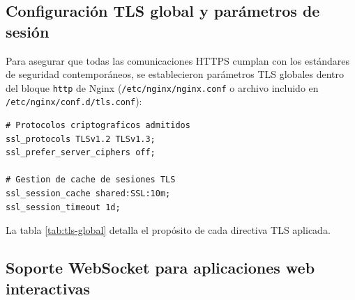 \subsection{Configuración TLS global y parámetros de sesión}

Para asegurar que todas las comunicaciones HTTPS cumplan con los estándares de
seguridad contemporáneos, se establecieron parámetros TLS globales dentro del
bloque \texttt{http} de Nginx (\texttt{/etc/nginx/nginx.conf} o archivo incluido
en \texttt{/etc/nginx/conf.d/tls.conf}):

\begin{lstlisting}[style=terminal]
# Protocolos criptograficos admitidos
ssl_protocols TLSv1.2 TLSv1.3;
ssl_prefer_server_ciphers off;

# Gestion de cache de sesiones TLS
ssl_session_cache shared:SSL:10m;
ssl_session_timeout 1d;
\end{lstlisting}

La tabla \ref{tab:tls-global} detalla el propósito de cada directiva TLS
aplicada.

\begin{table}[H]
\centering
\caption{Directivas TLS globales de Nginx}
\label{tab:tls-global}
\end{table}

\subsection{Soporte WebSocket para aplicaciones web interactivas}

